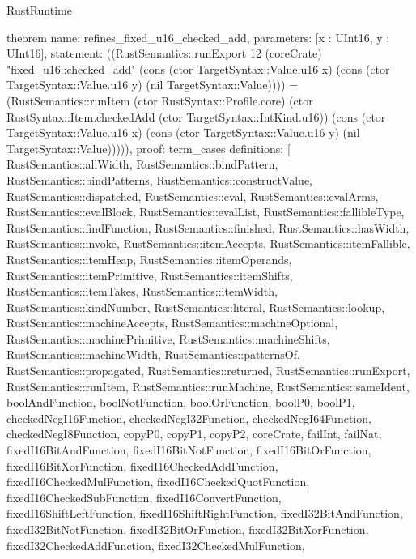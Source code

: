 \begin{lexlean}{RustRuntime}
\begin{semanticmodule}
theorem{
  name: refines_fixed_u16_checked_add,
  parameters: [x : UInt16, y : UInt16],
  statement: ((RustSemantics::runExport 12 (coreCrate) "fixed_u16::checked_add" (cons (ctor TargetSyntax::Value.u16 x) (cons (ctor TargetSyntax::Value.u16 y) (nil TargetSyntax::Value)))) = (RustSemantics::runItem (ctor RustSyntax::Profile.core) (ctor RustSyntax::Item.checkedAdd (ctor TargetSyntax::IntKind.u16)) (cons (ctor TargetSyntax::Value.u16 x) (cons (ctor TargetSyntax::Value.u16 y) (nil TargetSyntax::Value))))),
  proof: term_cases{
    definitions: [
      RustSemantics::allWidth,
      RustSemantics::bindPattern,
      RustSemantics::bindPatterns,
      RustSemantics::constructValue,
      RustSemantics::dispatched,
      RustSemantics::eval,
      RustSemantics::evalArms,
      RustSemantics::evalBlock,
      RustSemantics::evalList,
      RustSemantics::fallibleType,
      RustSemantics::findFunction,
      RustSemantics::finished,
      RustSemantics::hasWidth,
      RustSemantics::invoke,
      RustSemantics::itemAccepts,
      RustSemantics::itemFallible,
      RustSemantics::itemHeap,
      RustSemantics::itemOperands,
      RustSemantics::itemPrimitive,
      RustSemantics::itemShifts,
      RustSemantics::itemTakes,
      RustSemantics::itemWidth,
      RustSemantics::kindNumber,
      RustSemantics::literal,
      RustSemantics::lookup,
      RustSemantics::machineAccepts,
      RustSemantics::machineOptional,
      RustSemantics::machinePrimitive,
      RustSemantics::machineShifts,
      RustSemantics::machineWidth,
      RustSemantics::patternsOf,
      RustSemantics::propagated,
      RustSemantics::returned,
      RustSemantics::runExport,
      RustSemantics::runItem,
      RustSemantics::runMachine,
      RustSemantics::sameIdent,
      boolAndFunction,
      boolNotFunction,
      boolOrFunction,
      boolP0,
      boolP1,
      checkedNegI16Function,
      checkedNegI32Function,
      checkedNegI64Function,
      checkedNegI8Function,
      copyP0,
      copyP1,
      copyP2,
      coreCrate,
      failInt,
      failNat,
      fixedI16BitAndFunction,
      fixedI16BitNotFunction,
      fixedI16BitOrFunction,
      fixedI16BitXorFunction,
      fixedI16CheckedAddFunction,
      fixedI16CheckedMulFunction,
      fixedI16CheckedQuotFunction,
      fixedI16CheckedSubFunction,
      fixedI16ConvertFunction,
      fixedI16ShiftLeftFunction,
      fixedI16ShiftRightFunction,
      fixedI32BitAndFunction,
      fixedI32BitNotFunction,
      fixedI32BitOrFunction,
      fixedI32BitXorFunction,
      fixedI32CheckedAddFunction,
      fixedI32CheckedMulFunction,
}}
\end{semanticmodule}
\end{lexlean}
